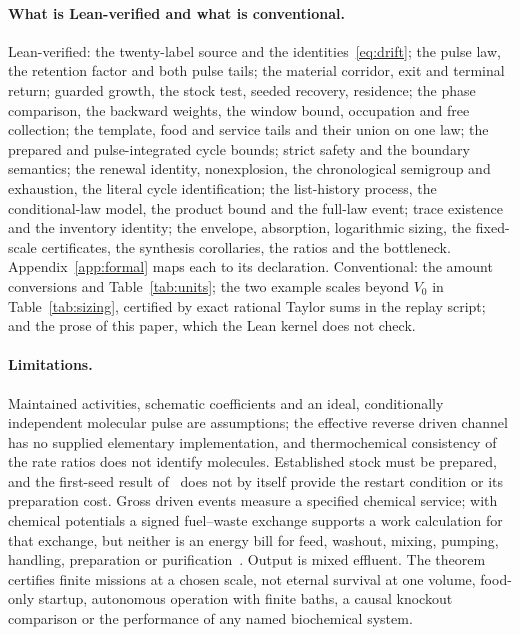 \documentclass[11pt,a4paper]{article}
\theoremstyle{plain}
\theoremstyle{definition}
\theoremstyle{remark}
\begin{document}
\paragraph{What is Lean-verified and what is conventional.}
Lean-verified: the twenty-label source and the identities~\eqref{eq:drift}; the pulse law, the retention factor and both pulse tails; the material corridor, exit and terminal return; guarded growth, the stock test, seeded recovery, residence; the phase comparison, the backward weights, the window bound, occupation and free collection; the template, food and service tails and their union on one law; the prepared and pulse-integrated cycle bounds; strict safety and the boundary semantics; the renewal identity, nonexplosion, the chronological semigroup and exhaustion, the literal cycle identification; the list-history process, the conditional-law model, the product bound and the full-law event; trace existence and the inventory identity; the envelope, absorption, logarithmic sizing, the fixed-scale certificates, the synthesis corollaries, the ratios and the bottleneck. Appendix~\ref{app:formal} maps each to its declaration. Conventional: the amount conversions and Table~\ref{tab:units}; the two example scales beyond $V_0$ in Table~\ref{tab:sizing}, certified by exact rational Taylor sums in the replay script; and the prose of this paper, which the Lean kernel does not check.

\paragraph{Limitations.}
Maintained activities, schematic coefficients and an ideal, conditionally independent molecular pulse are assumptions; the effective reverse driven channel has no supplied elementary implementation, and thermochemical consistency of the rate ratios does not identify molecules. Established stock must be prepared, and the first-seed result of~\citep{thermo2026} does not by itself provide the restart condition or its preparation cost. Gross driven events measure a specified chemical service; with chemical potentials a signed fuel--waste exchange supports a work calculation for that exchange, but neither is an energy bill for feed, washout, mixing, pumping, handling, preparation or purification~\citep{rao2016,rao2018}. Output is mixed effluent. The theorem certifies finite missions at a chosen scale, not eternal survival at one volume, food-only startup, autonomous operation with finite baths, a causal knockout comparison or the performance of any named biochemical system.
\end{document}
